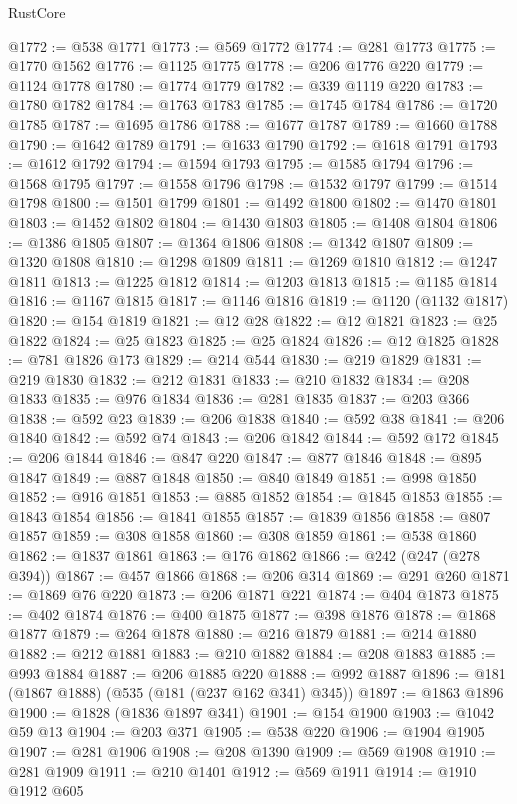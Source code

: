 \begin{lexlean}{RustCore}
\begin{coremodule}
@1772 := @538 @1771
@1773 := @569 @1772
@1774 := @281 @1773
@1775 := @1770 @1562
@1776 := @1125 @1775
@1778 := @206 @1776 @220
@1779 := @1124 @1778
@1780 := @1774 @1779
@1782 := @339 @1119 @220
@1783 := @1780 @1782
@1784 := @1763 @1783
@1785 := @1745 @1784
@1786 := @1720 @1785
@1787 := @1695 @1786
@1788 := @1677 @1787
@1789 := @1660 @1788
@1790 := @1642 @1789
@1791 := @1633 @1790
@1792 := @1618 @1791
@1793 := @1612 @1792
@1794 := @1594 @1793
@1795 := @1585 @1794
@1796 := @1568 @1795
@1797 := @1558 @1796
@1798 := @1532 @1797
@1799 := @1514 @1798
@1800 := @1501 @1799
@1801 := @1492 @1800
@1802 := @1470 @1801
@1803 := @1452 @1802
@1804 := @1430 @1803
@1805 := @1408 @1804
@1806 := @1386 @1805
@1807 := @1364 @1806
@1808 := @1342 @1807
@1809 := @1320 @1808
@1810 := @1298 @1809
@1811 := @1269 @1810
@1812 := @1247 @1811
@1813 := @1225 @1812
@1814 := @1203 @1813
@1815 := @1185 @1814
@1816 := @1167 @1815
@1817 := @1146 @1816
@1819 := @1120 (@1132 @1817)
@1820 := @154 @1819
@1821 := @12 @28
@1822 := @12 @1821
@1823 := @25 @1822
@1824 := @25 @1823
@1825 := @25 @1824
@1826 := @12 @1825
@1828 := @781 @1826 @173
@1829 := @214 @544
@1830 := @219 @1829
@1831 := @219 @1830
@1832 := @212 @1831
@1833 := @210 @1832
@1834 := @208 @1833
@1835 := @976 @1834
@1836 := @281 @1835
@1837 := @203 @366
@1838 := @592 @23
@1839 := @206 @1838
@1840 := @592 @38
@1841 := @206 @1840
@1842 := @592 @74
@1843 := @206 @1842
@1844 := @592 @172
@1845 := @206 @1844
@1846 := @847 @220
@1847 := @877 @1846
@1848 := @895 @1847
@1849 := @887 @1848
@1850 := @840 @1849
@1851 := @998 @1850
@1852 := @916 @1851
@1853 := @885 @1852
@1854 := @1845 @1853
@1855 := @1843 @1854
@1856 := @1841 @1855
@1857 := @1839 @1856
@1858 := @807 @1857
@1859 := @308 @1858
@1860 := @308 @1859
@1861 := @538 @1860
@1862 := @1837 @1861
@1863 := @176 @1862
@1866 := @242 (@247 (@278 @394))
@1867 := @457 @1866
@1868 := @206 @314
@1869 := @291 @260
@1871 := @1869 @76 @220
@1873 := @206 @1871 @221
@1874 := @404 @1873
@1875 := @402 @1874
@1876 := @400 @1875
@1877 := @398 @1876
@1878 := @1868 @1877
@1879 := @264 @1878
@1880 := @216 @1879
@1881 := @214 @1880
@1882 := @212 @1881
@1883 := @210 @1882
@1884 := @208 @1883
@1885 := @993 @1884
@1887 := @206 @1885 @220
@1888 := @992 @1887
@1896 := @181 (@1867 @1888) (@535 (@181 (@237 @162 @341) @345))
@1897 := @1863 @1896
@1900 := @1828 (@1836 @1897 @341)
@1901 := @154 @1900
@1903 := @1042 @59 @13
@1904 := @203 @371
@1905 := @538 @220
@1906 := @1904 @1905
@1907 := @281 @1906
@1908 := @208 @1390
@1909 := @569 @1908
@1910 := @281 @1909
@1911 := @210 @1401
@1912 := @569 @1911
@1914 := @1910 @1912 @605

\end{coremodule}
\end{lexlean}
